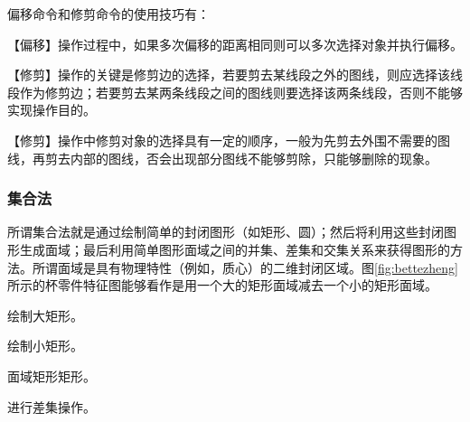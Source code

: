 偏移命令和修剪命令的使用技巧有：
\begin{tips}
\item 【偏移】操作过程中，如果多次偏移的距离相同则可以多次选择对象并执行偏移。
\item 【修剪】操作的关键是修剪边的选择，若要剪去某线段之外的图线，则应选择该线段作为修剪边；若要剪去某两条线段之间的图线则要选择该两条线段，否则不能够实现操作目的。
\item 【修剪】操作中修剪对象的选择具有一定的顺序，一般为先剪去外围不需要的图线，再剪去内部的图线，否会出现部分图线不能够剪除，只能够删除的现象。
\end{tips}

\subsubsection{集合法}
所谓集合法就是通过绘制简单的封闭图形（如矩形、圆）；然后将利用这些封闭图形生成面域；最后利用简单图形面域之间的并集、差集和交集关系来获得图形的方法。所谓面域是具有物理特性（例如，质心）的二维封闭区域。图\ref{fig:bettezheng}所示的杯零件特征图能够看作是用一个大的矩形面域减去一个小的矩形面域。
\begin{procedure}
\item 绘制大矩形。
\item 绘制小矩形。
\item 面域矩形矩形。
\item 进行差集操作。
\end{procedure}
\endinput